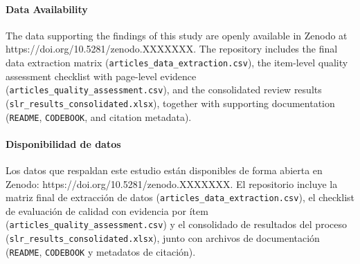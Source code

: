 \newcommand{\zenodoDOI}{https://doi.org/10.5281/zenodo.XXXXXXX}

\paragraph{Data Availability}
The data supporting the findings of this study are openly available in Zenodo at \zenodoDOI. The repository includes the final data extraction matrix (\texttt{articles\_data\_extraction.csv}), the item-level quality assessment checklist with page-level evidence (\texttt{articles\_quality\_assessment.csv}), and the consolidated review results (\texttt{slr\_results\_consolidated.xlsx}), together with supporting documentation (\texttt{README}, \texttt{CODEBOOK}, and citation metadata).

\paragraph{Disponibilidad de datos}
Los datos que respaldan este estudio están disponibles de forma abierta en Zenodo: \zenodoDOI. El repositorio incluye la matriz final de extracción de datos (\texttt{articles\_data\_extraction.csv}), el checklist de evaluación de calidad con evidencia por ítem (\texttt{articles\_quality\_assessment.csv}) y el consolidado de resultados del proceso (\texttt{slr\_results\_consolidated.xlsx}), junto con archivos de documentación (\texttt{README}, \texttt{CODEBOOK} y metadatos de citación).
